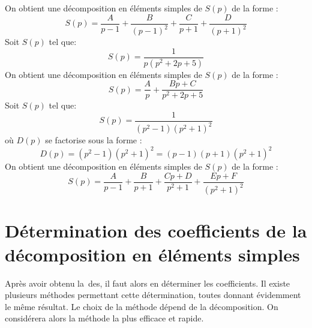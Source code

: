 On obtient une décomposition en éléments simples de $S(p)$ de la forme :
\[
S(p)=\dfrac{A}{p-1}+\dfrac{B}{(p-1)^2}+\dfrac{C}{p+1}+\dfrac{D}{(p+1)^2}
\]
\exemple
Soit $S(p)$ tel que:
\[
S(p)=\dfrac{1}{p(p^2+2p+5)}
\]
On obtient une décomposition en éléments simples de $S(p)$ de la forme :
\[
    S(p)=\frac{A}{p}+\frac{Bp+C}{p^2+2p+5}
\]
\exemple
Soit $S(p)$ tel que:
\[
S(p)=\dfrac{1}{(p^2-1)(p^2+1)^2}
\]
où $D(p)$ se factorise sous la forme :
\[
D(p)=(p^2-1)(p^2+1)^2=(p-1)(p+1)(p^2+1)^2
\]
On obtient une décomposition en éléments simples de $S(p)$ de la forme :
\[
    S(p)=\dfrac{A}{p-1}+\dfrac{B}{p+1}+\dfrac{Cp+D}{p^2+1}+\dfrac{Ep+F}{(p^2+1)^2}
\]
\section[Détermination des coefficients de la DES]
        {Détermination des coefficients de la 
         décomposition en éléments simples}
Après avoir obtenu la~\gls{des}, il faut alors en déterminer les coefficients.
Il existe plusieurs méthodes permettant cette détermination, toutes donnant 
évidemment le même résultat. Le choix de la méthode dépend de la décomposition.
On considérera alors la méthode la plus efficace et rapide.

